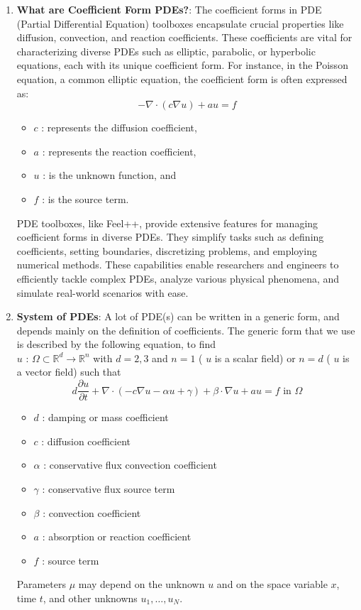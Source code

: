\documentclass[12pt]{article}
\begin{document}
\begin{enumerate}
    \item \textbf{What are Coefficient Form PDEs?}: The coefficient forms in PDE (Partial Differential Equation) toolboxes encapsulate crucial properties like diffusion, convection, and reaction coefficients. These coefficients are vital for characterizing diverse PDEs such as elliptic, parabolic, or hyperbolic equations, each with its unique coefficient form.
    For instance, in the Poisson equation, a common elliptic equation, the coefficient form is often expressed as:
    \[
        -\nabla \cdot (c \nabla u) + au = f
    \]

    \begin{itemize}
        \item \(c\) : represents the diffusion coefficient,
        \item \(a\) : represents the reaction coefficient,
        \item \(u\) : is the unknown function, and
        \item \(f\) : is the source term.
    \end{itemize}
    
    PDE toolboxes, like Feel++, provide extensive features for managing coefficient forms in diverse PDEs. They simplify tasks such as defining coefficients, setting boundaries, discretizing problems, and employing numerical methods. These capabilities enable researchers and engineers to efficiently tackle complex PDEs, analyze various physical phenomena, and simulate real-world scenarios with ease.

    \item \textbf{System of PDEs}: A lot of PDE(s) can be written in a generic form, and depends mainly on the definition of coefficients. The generic form that we use is described by the following equation, to find \\
    \( u \) : \( \Omega \subset \mathbb{R}^d \longrightarrow \mathbb{R}^n \) with \( d = 2, 3 \) and \( n = 1 \) ( \( u \) is a scalar field) or \( n = d \) ( \( u \) is a vector field) such that
    \[
    d \frac{\partial u}{\partial t} + \nabla \cdot \left( -c \nabla u - \alpha u + \gamma \right) + \beta \cdot \nabla u + au = f \text{ in } \Omega
    \]
    \begin{itemize}
        \item \( d \) : damping or mass coefficient
        \item \( c \) : diffusion coefficient
        \item \( \alpha \) : conservative flux convection coefficient
        \item \( \gamma \) : conservative flux source term
        \item \( \beta \) : convection coefficient
        \item \( a \) : absorption or reaction coefficient
        \item \( f \) : source term
    \end{itemize}
    Parameters \( \mu \) may depend on the unknown \( u \) and on the space variable \( x \), time \( t \), and other unknowns \( u_1, \ldots, u_N \).


\end{enumerate}
\end{document}
